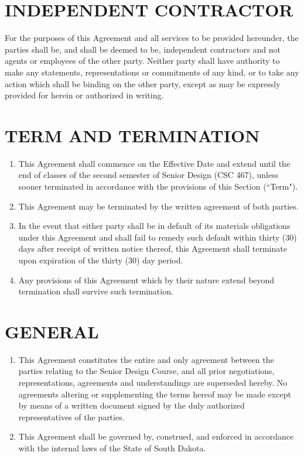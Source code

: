 \documentclass[11pt]{article}
\begin{document}
\section{INDEPENDENT CONTRACTOR}  

For the purposes of this Agreement and all services to be provided hereunder, the parties shall be, and shall be deemed to be, independent contractors and not agents or employees of the other party. Neither party shall have authority to make any statements, representations or commitments of any kind, or to take any action which shall be binding on the other party, except as may be expressly provided for herein or authorized in writing.  

\section{TERM AND TERMINATION }    
\begin{enumerate}  \itemsep4pt \parskip0pt 
\item This Agreement shall commence on the Effective Date and extend until the end of classes of the second semester of Senior Design (CSC 467), unless sooner terminated in accordance with the provisions of this Section (``Term"). 

\item This Agreement may be terminated by the written agreement of both       parties.    

\item In the event that either party shall be in default of its       materials obligations under this Agreement and shall fail to       remedy such default within thirty (30) days after receipt of       written notice thereof, this Agreement shall terminate upon       expiration of the thirty (30) day period.    

\item Any provisions of this Agreement which by their nature extend       beyond termination shall survive such termination.  
\end{enumerate}



\section{GENERAL }    
\begin{enumerate}  \itemsep4pt \parskip0pt 
\item This Agreement constitutes the entire and only agreement between       the parties relating to the Senior Design Course, and all prior       negotiations, representations, agreements and understandings are       superseded hereby. No agreements altering or supplementing the       terms hereof may be made except by means of a written document       signed by the duly authorized representatives of the parties.    

\item This Agreement shall be governed by, construed, and enforced in       accordance with the internal laws of the State of South Dakota. 
\end{enumerate}
\end{document}

